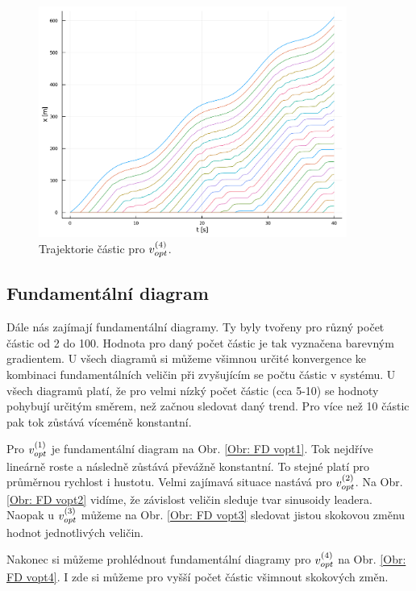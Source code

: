 \documentclass[a4paper, 12pt, fleqn]{article}
\begin{document}
\begin{figure}
	\centering
	\includegraphics[width=0.9\textwidth]{images/trajektorie_3.pdf}
	\caption{Trajektorie částic pro $v_{opt}^{(4)}$.}
	\label{Obr: Trajektorie 4}
\end{figure}

\subsection{Fundamentální diagram}

Dále nás zajímají fundamentální diagramy. Ty byly tvořeny pro různý počet částic od 2 do 100. Hodnota pro daný počet částic je tak vyznačena barevným gradientem. U všech diagramů si můžeme všimnou určité konvergence ke kombinaci fundamentálních veličin při zvyšujícím se počtu částic v systému. U všech diagramů platí, že pro velmi nízký počet částic (cca 5-10) se hodnoty pohybují určitým směrem, než začnou sledovat daný trend. Pro více než 10 částic pak tok zůstává víceméně konstantní.

Pro $v_{opt}^{(1)}$ je fundamentální diagram na  Obr. \ref{Obr: FD vopt1}. Tok nejdříve lineárně roste a následně zůstává převážně konstantní. To stejné platí pro průměrnou rychlost i hustotu. Velmi zajímavá situace nastává pro $v_{opt}^{(2)}$. Na Obr. \ref{Obr: FD vopt2} vidíme, že závislost veličin sleduje tvar sinusoidy leadera. Naopak u $v_{opt}^{(3)}$ můžeme na Obr. \ref{Obr: FD vopt3} sledovat jistou skokovou změnu hodnot jednotlivých veličin. %

Nakonec si můžeme prohlédnout fundamentální diagramy pro $v_{opt}^{(4)}$ na Obr. \ref{Obr: FD vopt4}. I zde si můžeme pro vyšší počet částic všimnout skokových změn.
\end{document}
